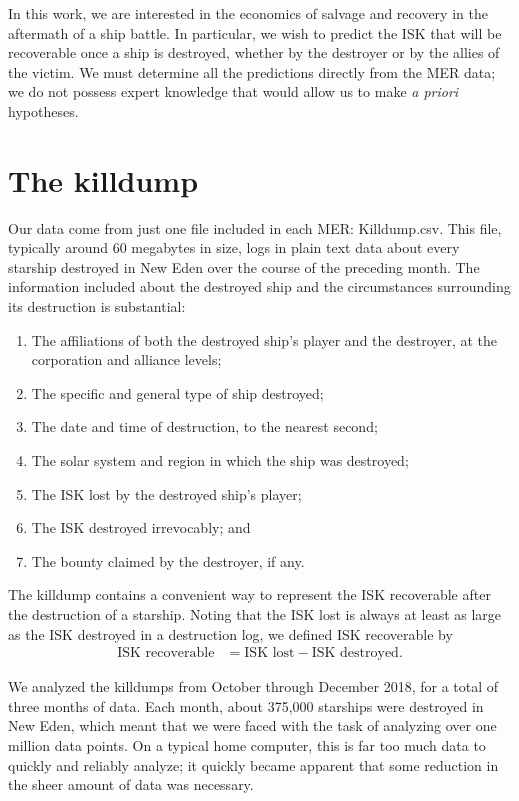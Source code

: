 \documentclass[letterpaper,12pt,article]{memoir}
\begin{document}
In this work, we are interested in the economics of salvage and recovery in the
aftermath of a ship battle. In particular, we wish to predict the ISK that will
be recoverable once a ship is destroyed, whether by the destroyer or by the
allies of the victim. We must determine all the predictions directly from the
MER data; we do not possess expert knowledge that would allow us to make
\textit{a priori} hypotheses.

\section{The killdump}

Our data come from just one file included in each MER: {\ttfamily Killdump.csv}.
This file, typically around 60 megabytes in size, logs in plain text data about
every starship destroyed in New Eden over the course of the preceding month. The
information included about the destroyed ship and the circumstances surrounding 
its destruction is substantial:
\begin{enumerate}[nolistsep,label=\textbf{--}]
    \item The affiliations of both the destroyed ship's player and the 
    destroyer, at the corporation and alliance levels;
    \item The specific and general type of ship destroyed;
    \item The date and time of destruction, to the nearest second;
    \item The solar system and region in which the ship was destroyed;
    \item The ISK lost by the destroyed ship's player;
    \item The ISK destroyed irrevocably; and
    \item The bounty claimed by the destroyer, if any.
\end{enumerate}

The killdump contains a convenient way to represent the ISK recoverable after
the destruction of a starship. Noting that the ISK lost is always at least as
large as the ISK destroyed in a destruction log, we defined ISK recoverable by
\begin{align} \label{eq:response}
    \textrm{ISK recoverable} &= \textrm{ISK lost} - \textrm{ISK destroyed}.
\end{align}


We analyzed the killdumps from October through December 2018, for a total of
three months of data. Each month, about 375,000 starships were destroyed in
New Eden, which meant that we were faced with the task of analyzing over one
million data points. On a typical home computer, this is far too much data to
quickly and reliably analyze; it quickly became apparent that some reduction
in the sheer amount of data was necessary.
\end{document}
